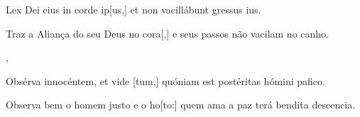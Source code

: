 {  {\item {}Lex Dei eius in corde ip[us,] et non vacillábunt gressus ius.~\Responsorium}%
    {\item {}Traz a Aliança do seu Deus no cora[,] e seus passos não vacilam no canho.~\Responsorium},
  {\item {}Obsérva innocéntem, et vide [tum,] quóniam est postéritas hómini pafico.~\Responsorium}%
    {\item {}Observa bem o homem justo e o ho[to:] quem ama a paz terá bendita descencia.~\Responsorium}
}
